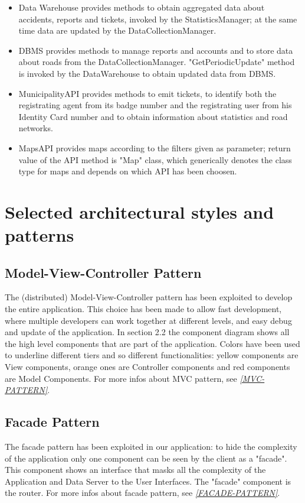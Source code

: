 \documentclass[a4paper]{report}
\begin{document}
\begin{itemize}
\item Data Warehouse provides methods to obtain aggregated data about accidents, reports and tickets, invoked by the StatisticsManager; at the same time data are updated by the DataCollectionManager.
\item DBMS provides methods to manage reports and accounts and to store data about roads from the DataCollectionManager. "GetPeriodicUpdate" method is invoked by the DataWarehouse to obtain updated data from DBMS.
\item MunicipalityAPI provides methods to emit tickets, to identify both the registrating agent from its badge number and the registrating user from his Identity Card number and to obtain information about statistics and road networks.
\item MapsAPI provides maps according to the filters given as parameter; return value of the API method is "Map" class, which generically denotes the class type for maps and depends on which API has been choosen.
\end{itemize}

\section{Selected architectural	styles and patterns}
\subsection{Model-View-Controller Pattern}
The (distributed) Model-View-Controller pattern has been exploited to develop the entire application.  This choice has been made to allow fast development, where multiple developers can work together at different levels, and easy debug and update of the application. In section 2.2 the component diagram shows all the high level components that are part of the application. Colors have been used to underline different tiers and so different functionalities: yellow components are View components, orange ones are Controller components and red components are Model Components. For more infos about MVC pattern, see \hyperref[ref:MVC-pattern]{\textit{[MVC-PATTERN]}}.
\subsection{Facade Pattern}
The facade pattern has been exploited in our application: to hide the complexity of the application only one component can be seen by the client as a "facade". This component shows an interface that masks all the complexity of the Application and Data Server to the User Interfaces. The "facade" component is the router. For more infos about facade pattern, see \hyperref[ref:facade-pattern]{\textit{[FACADE-PATTERN]}}.
\end{document}
